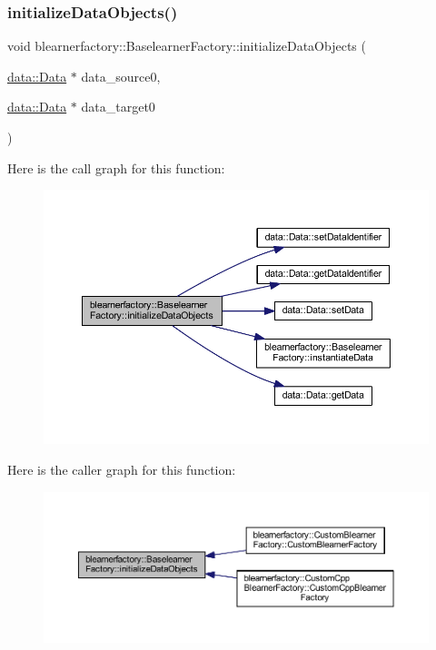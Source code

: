 \subsubsection{\texorpdfstring{initialize\+Data\+Objects()}{initializeDataObjects()}}
{\footnotesize\ttfamily void blearnerfactory\+::\+Baselearner\+Factory\+::initialize\+Data\+Objects (\begin{DoxyParamCaption}\item[{\mbox{\hyperlink{classdata_1_1_data}{data\+::\+Data}} $\ast$}]{data\+\_\+source0,  }\item[{\mbox{\hyperlink{classdata_1_1_data}{data\+::\+Data}} $\ast$}]{data\+\_\+target0 }\end{DoxyParamCaption})}

Here is the call graph for this function\+:\nopagebreak
\begin{figure}[H]
\begin{center}
\leavevmode
\includegraphics[width=350pt]{classblearnerfactory_1_1_baselearner_factory_a147d4ef123ec382fe402d562a91df4d2_cgraph}
\end{center}
\end{figure}
Here is the caller graph for this function\+:\nopagebreak
\begin{figure}[H]
\begin{center}
\leavevmode
\includegraphics[width=350pt]{classblearnerfactory_1_1_baselearner_factory_a147d4ef123ec382fe402d562a91df4d2_icgraph}
\end{center}
\end{figure}
\mbox{\label{classblearnerfactory_1_1_baselearner_factory_ac4a38c4815fb33b8d4785745117c5e57}} 
